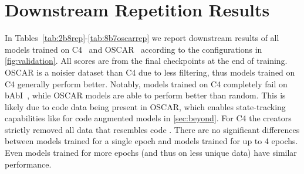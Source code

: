 \documentclass{article}
\begin{document}
\FloatBarrier

\section{Downstream Repetition Results}
\label{sec:downrep}

In Tables~\ref{tab:2b8rep}-\ref{tab:8b7oscarrep} we report downstream results of all models trained on C4~\cite{raffel2020exploring} and OSCAR~\cite{ortiz-suarez-etal-2020-monolingual} according to the configurations in \autoref{fig:validation}. All scores are from the final checkpoints at the end of training. OSCAR is a noisier dataset than C4 due to less filtering, thus models trained on C4 generally perform better. Notably, models trained on C4 completely fail on bAbI~\cite{weston2015towards}, while OSCAR models are able to perform better than random. This is likely due to code data being present in OSCAR, which enables state-tracking capabilities like for code augmented models in \autoref{sec:beyond}. For C4 the creators strictly removed all data that resembles code \cite{raffel2020exploring}. There are no significant differences between models trained for a single epoch and models trained for up to 4 epochs. Even models trained for more epochs (and thus on less unique data) have similar performance.
\end{document}
